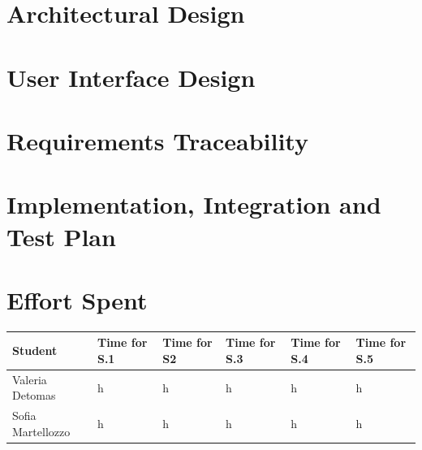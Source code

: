\documentclass{article}
\begin{document}
\section{Architectural Design}


\newpage
\section{User Interface Design}


\newpage
\section{Requirements Traceability}


\newpage
\section{Implementation, Integration and Test Plan}




\newpage 
\section{Effort Spent}
\begin{table}[h]
      \centering
      \begin{tabular}{|p{3cm}||p{2cm}|p{2cm}|p{2cm}|p{2cm}|p{1cm}|}
            \hline
            Student & Time for S.1 & Time for S2 & Time for S.3 & Time for S.4 & Time for S.5\\
            \hline
            Valeria Detomas & h & h & h & h & h\\
            \hline
            Sofia Martellozzo & h & h & h & h & h\\
            \hline
      \end{tabular}
\end{table}

\end{document}

